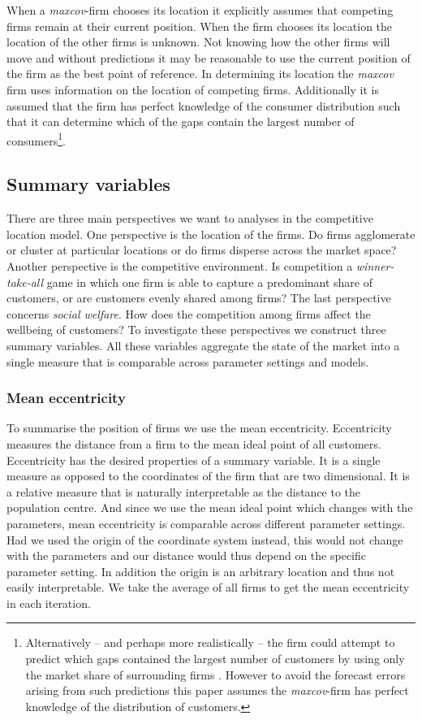 \documentclass[preprint, 12pt]{elsarticle}
\begin{document}
When a \emph{maxcov}-firm chooses its location it explicitly assumes that competing firms remain at their current position. When the firm chooses its location the location of the other firms is unknown. Not knowing how the other firms will move and without predictions it may be reasonable to use the current position of the firm as the best point of reference. In determining its location the \emph{maxcov} firm uses information on the location of competing firms. Additionally it is assumed that the firm has perfect knowledge of the consumer distribution such that it can determine which of the gaps contain the largest number of consumers\footnote{Alternatively -- and perhaps more realistically -- the firm could attempt to predict which gaps contained the largest number of customers by using only the market share of surrounding firms \citep[p.~75]{Fowler_Laver_2008}. However to avoid the forecast errors arising from such predictions this paper assumes the \emph{maxcov}-firm has perfect knowledge of the distribution of customers.}.

\subsection{Summary variables}

There are three main perspectives we want to analyses in the competitive location model. One perspective is the location of the firms. Do firms agglomerate or cluster at particular locations or do firms disperse across the market space? Another perspective is the competitive environment. Is competition a \emph{winner-take-all} game in which one firm is able to capture a predominant share of customers, or are customers evenly shared among firms? The last perspective concerns \emph{social welfare}. How does the competition among firms affect the wellbeing of customers? To investigate these perspectives we construct three summary variables. All these variables aggregate the state of the market into a single measure that is comparable across parameter settings and models.

\subsubsection*{Mean eccentricity}
To summarise the position of firms we use the mean eccentricity. Eccentricity measures the distance from a firm to the mean ideal point of all customers. Eccentricity has the desired properties of a summary variable. It is a single measure as opposed to the coordinates of the firm that are two dimensional. It is a relative measure that is naturally interpretable as the distance to the population centre. And since we use the mean ideal point which changes with the parameters, mean eccentricity is comparable across different parameter settings. Had we used the origin of the coordinate system instead, this would not change with the parameters and our distance would thus depend on the specific parameter setting. In addition the origin is an arbitrary location and thus not easily interpretable. We take the average of all firms to get the mean eccentricity in each iteration.
\end{document}
